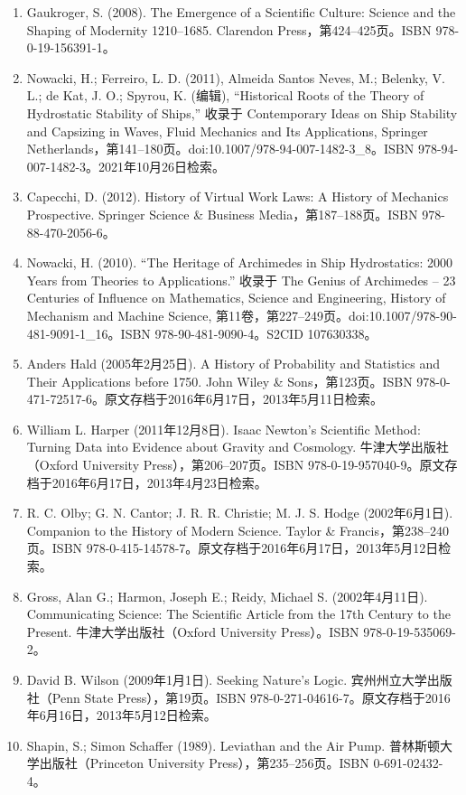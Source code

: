 \begin{enumerate}
\item Gaukroger, S. (2008). The Emergence of a Scientific Culture: Science and the Shaping of Modernity 1210–1685. Clarendon Press，第424–425页。ISBN 978-0-19-156391-1。
\item Nowacki, H.; Ferreiro, L. D. (2011), Almeida Santos Neves, M.; Belenky, V. L.; de Kat, J. O.; Spyrou, K. (编辑), “Historical Roots of the Theory of Hydrostatic Stability of Ships,” 收录于 Contemporary Ideas on Ship Stability and Capsizing in Waves, Fluid Mechanics and Its Applications, Springer Netherlands，第141–180页。doi:10.1007/978-94-007-1482-3_8。ISBN 978-94-007-1482-3。2021年10月26日检索。
\item Capecchi, D. (2012). History of Virtual Work Laws: A History of Mechanics Prospective. Springer Science & Business Media，第187–188页。ISBN 978-88-470-2056-6。
\item Nowacki, H. (2010). “The Heritage of Archimedes in Ship Hydrostatics: 2000 Years from Theories to Applications.” 收录于 The Genius of Archimedes – 23 Centuries of Influence on Mathematics, Science and Engineering, History of Mechanism and Machine Science, 第11卷，第227–249页。doi:10.1007/978-90-481-9091-1_16。ISBN 978-90-481-9090-4。S2CID 107630338。
\item Anders Hald (2005年2月25日). A History of Probability and Statistics and Their Applications before 1750. John Wiley & Sons，第123页。ISBN 978-0-471-72517-6。原文存档于2016年6月17日，2013年5月11日检索。
\item William L. Harper (2011年12月8日). Isaac Newton's Scientific Method: Turning Data into Evidence about Gravity and Cosmology. 牛津大学出版社（Oxford University Press），第206–207页。ISBN 978-0-19-957040-9。原文存档于2016年6月17日，2013年4月23日检索。
\item R. C. Olby; G. N. Cantor; J. R. R. Christie; M. J. S. Hodge (2002年6月1日). Companion to the History of Modern Science. Taylor & Francis，第238–240页。ISBN 978-0-415-14578-7。原文存档于2016年6月17日，2013年5月12日检索。
\item Gross, Alan G.; Harmon, Joseph E.; Reidy, Michael S. (2002年4月11日). Communicating Science: The Scientific Article from the 17th Century to the Present. 牛津大学出版社（Oxford University Press）。ISBN 978-0-19-535069-2。
\item David B. Wilson (2009年1月1日). Seeking Nature's Logic. 宾州州立大学出版社（Penn State Press），第19页。ISBN 978-0-271-04616-7。原文存档于2016年6月16日，2013年5月12日检索。
\item Shapin, S.; Simon Schaffer (1989). Leviathan and the Air Pump. 普林斯顿大学出版社（Princeton University Press），第235–256页。ISBN 0-691-02432-4。

\end{enumerate}
